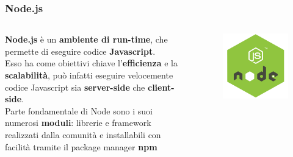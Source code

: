 \documentclass{beamer}
\begin{document}
\begin{frame}
	\frametitle{Node.js}
	\begin{columns}
		\textbf{Node.js} è un \textbf{ambiente di run-time},
		che permette di eseguire codice \textbf{Javascript}.
		\smallskip \\
		Esso ha come obiettivi chiave l'\textbf{efficienza} 
		e la \textbf{scalabilità}, può infatti eseguire
		velocemente codice Javascript sia \textbf{server-side}
		che \textbf{client-side}.\\
		\smallskip
		Parte fondamentale di Node sono
		i suoi numerosi \textbf{moduli}: librerie e framework
		realizzati dalla comunità e installabili con facilità
		tramite il package manager \textbf{npm}
		\centering
		\begin{figure}
			\includegraphics[width=\textwidth]{figures/node.png}
		\end{figure} 
	\end{columns}
\end{frame}
\end{document}
